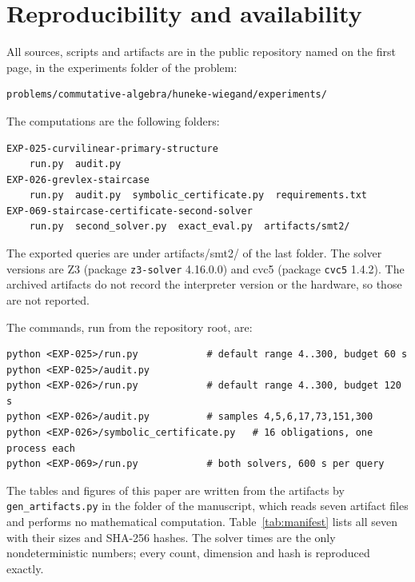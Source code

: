 \documentclass[11pt]{article}
\theoremstyle{definition}
\theoremstyle{remark}
\begin{document}
\section{Reproducibility and availability}\label{sec:repro}

All sources, scripts and artifacts are in the public repository named on the first page, in the
experiments folder of the problem:
\begin{verbatim}
problems/commutative-algebra/huneke-wiegand/experiments/
\end{verbatim}
The computations are the following folders:
\begin{verbatim}
EXP-025-curvilinear-primary-structure
    run.py  audit.py
EXP-026-grevlex-staircase
    run.py  audit.py  symbolic_certificate.py  requirements.txt
EXP-069-staircase-certificate-second-solver
    run.py  second_solver.py  exact_eval.py  artifacts/smt2/
\end{verbatim}
The exported queries are under artifacts/smt2/ of the last folder. The
solver versions are Z3 \SolverZthree{} (package \texttt{z3-solver} 4.16.0.0) and cvc5 \SolverCvc{}
(package \texttt{cvc5} 1.4.2). The archived artifacts do not record the interpreter version or the
hardware, so those are not reported.

The commands, run from the repository root, are:
\begin{verbatim}
python <EXP-025>/run.py            # default range 4..300, budget 60 s
python <EXP-025>/audit.py
python <EXP-026>/run.py            # default range 4..300, budget 120 s
python <EXP-026>/audit.py          # samples 4,5,6,17,73,151,300
python <EXP-026>/symbolic_certificate.py   # 16 obligations, one process each
python <EXP-069>/run.py            # both solvers, 600 s per query
\end{verbatim}
The tables and figures of this paper are written from the artifacts by
\texttt{gen\_artifacts.py} in the folder of the manuscript, which reads seven artifact files and
performs no mathematical computation. Table~\ref{tab:manifest} lists all seven with their sizes
and SHA-256 hashes. The solver times are the only nondeterministic
numbers; every count, dimension and hash is reproduced exactly.

\begin{table}[ht]
\centering
\small
\resizebox{\textwidth}{!}{}
\caption{Artifact manifest: size in bytes and full SHA-256 of the artifact files read to produce
the tables and figures of the paper. The files are those committed in the repository under the
experiment folders named in the text.}
\label{tab:manifest}
\end{table}
\end{document}
